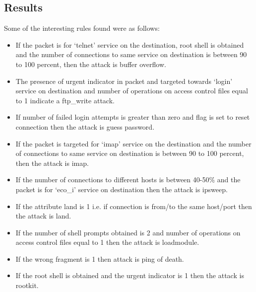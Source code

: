 \documentclass[11pt]{article}
\begin{document}
\subsection{Results}
Some of the interesting rules found were as follows:

\begin{itemize}
\item If the packet is for `telnet' service on the destination, root shell is obtained and the number of connections to same service on destination is between 90 to 100 percent, then the attack is buffer overflow.
\item The presence of urgent indicator in packet and targeted towards `login' service on destination and number of operations on access control files equal to 1 indicate a ftp\_write attack.
\item If number of failed login attempts is greater than zero and flag is set to reset connection then the attack is guess password.
\item If the packet is targeted for `imap' service on the destination and the number of connections to same service on destination is between 90 to 100 percent, then the attack is imap.
\item If the number of connections to different hosts is between 40-50\% and the packet is for `eco\_i' service on destination then the attack is ipsweep.
\item If the attribute land is 1 i.e. if connection is from/to the same host/port then the attack is land.
\item If the number of shell prompts obtained is 2 and number of operations on access control files equal to 1 then the attack is loadmodule.
\item If the wrong fragment is 1 then attack is ping of death.
\item If the root shell is obtained and the urgent indicator is 1 then the attack is rootkit.
\end{itemize}
\end{document}
